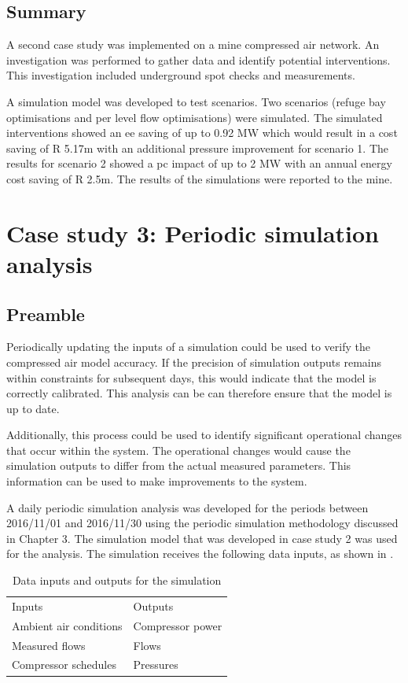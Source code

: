 	\subsection{Summary}
	A second case study was implemented on a mine compressed air network. An investigation was performed to gather data and identify potential interventions. This investigation included underground spot checks and measurements.
	\par 
	 A simulation model was developed to test scenarios. Two scenarios (refuge bay optimisations and per level flow optimisations) were simulated. The simulated interventions showed an \gls{ee} saving of up to 0.92 MW which would result in a cost saving of R 5.17m with an additional pressure improvement for scenario 1. The results for scenario 2 showed a \gls{pc} impact of up to 2 MW with an annual energy cost saving of R 2.5m. The results of the simulations were reported to the mine.
\section{Case study 3: Periodic simulation analysis}
	\subsection{Preamble}
	Periodically updating the inputs of a simulation could be used to verify the compressed air model accuracy. If the precision of simulation outputs remains within constraints for subsequent days, this would indicate that the model is correctly calibrated. This analysis can be can therefore ensure that the model is up to date.
	\par 
	 Additionally, this process could be used to identify significant operational changes that occur within the system. The operational changes would cause the simulation outputs to differ from the actual measured parameters. This information can be used to make improvements to the system.
	\par 
	A daily periodic simulation analysis was developed for the periods between 2016/11/01 and 2016/11/30 using the periodic simulation methodology discussed in Chapter 3. The simulation model that was developed in case study 2 was used for the analysis. The simulation receives the following data inputs, as shown in .
	\begin{table}[h!]
		\centering
		\begin{tabular}{ll}
			\hline
			Inputs \hspace*{4cm} &Outputs \hspace*{4cm} \\ \hhline{==}
			Ambient air conditions&Compressor power \\
			Measured flows& Flows \\
			Compressor schedules& Pressures \\
			\hline
		\end{tabular}
		\caption{Data inputs and outputs for the simulation}
		\label{table: Periodic inputs/outputs}
	\end{table}

